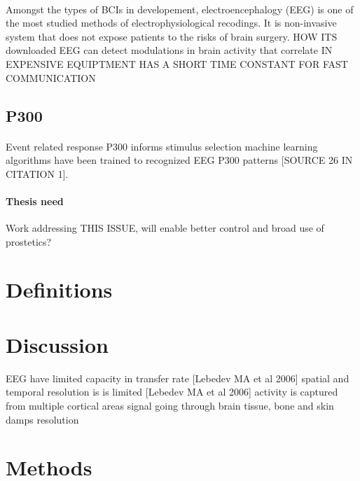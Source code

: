 \documentclass[twoside]{article}
\begin{document}
\paragraph{}
Amongst the types of BCIs in developement, electroencephalogy (EEG) is one of the most studied methods of electrophysiological recodings. It is non-invasive system that does not expose patients to the risks of brain surgery. HOW ITS downloaded
EEG can detect modulations in brain activity that correlate
IN EXPENSIVE EQUIPTMENT
HAS A SHORT TIME CONSTANT FOR FAST COMMUNICATION \citep{wolpaw2002brain}

\subsection{P300}
\paragraph{}
Event related response P300
informs stimulus selection
machine learning algorithms have been trained to recognized EEG P300 patterns [SOURCE 26 IN CITATION 1].

\paragraph{Thesis need}
Work addressing THIS ISSUE, will enable better control and broad use of prostetics?


\blindtext

\blindtext

\section{Definitions}

\blindtext

\blindtext
\section{Discussion}
EEG
  have limited capacity in transfer rate [Lebedev MA et al 2006]
  spatial and temporal resolution is is limited [Lebedev MA et al 2006]
    activity is captured from multiple cortical areas
    signal going through brain tissue, bone and skin damps resolution



\section{Methods}
\end{document}
